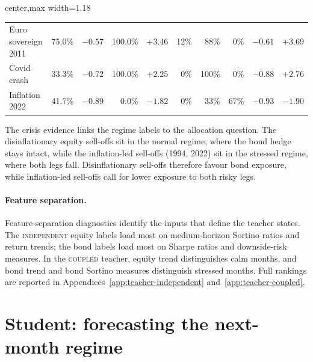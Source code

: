 \documentclass[10pt]{article}
\newcommand{\Acoup}{\textsc{coupled}}
\newcommand{\Bindep}{\textsc{independent}}
\begin{document}
\begin{table}[H]
\begin{adjustbox}{center,max width=1.18\textwidth}
\begin{tabular}{lrrrrrrrrr}
            Euro sovereign 2011     & \phantom{0}75.0\%                    & $-0.57$                                 & 100.0\%                            & $+3.46$                                   & 12\%                                & 88\%   & \phantom{0}0\% & $-0.61$ & $+3.69$ \\
            Covid crash             & \phantom{0}33.3\%                    & $-0.72$                                 & 100.0\%                            & $+2.25$                                   & 0\%                                 & 100\%  & \phantom{0}0\% & $-0.88$ & $+2.76$ \\
            Inflation 2022          & \phantom{0}41.7\%                    & $-0.89$                                 & \phantom{0}0.0\%                   & $-1.82$                                   & 0\%                                 & 33\%   & 67\%           & $-0.93$ & $-1.90$ \\
            \bottomrule
        \end{tabular}
    \end{adjustbox}
\end{table}

The crisis evidence links the regime labels to the allocation question. The disinflationary equity sell-offs sit in the normal regime, where the bond hedge stays intact, while the inflation-led sell-offs (1994, 2022) sit in the stressed regime, where both legs fall. Disinflationary sell-offs therefore favour bond exposure, while inflation-led sell-offs call for lower exposure to both risky legs.

\paragraph{Feature separation.}
Feature-separation diagnostics identify the inputs that define the teacher states. The
\Bindep{} equity labels load most on medium-horizon Sortino ratios and return trends; the
bond labels load most on Sharpe ratios and downside-risk measures. In the \Acoup{} teacher,
equity trend distinguishes calm months, and bond trend and bond Sortino measures distinguish
stressed months. Full rankings are reported in Appendices~\ref{app:teacher-independent}
and~\ref{app:teacher-coupled}.


\section{Student: forecasting the next-month regime}
\label{sec:student}
\end{document}
